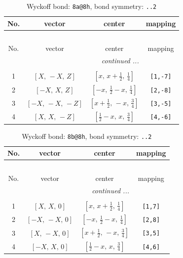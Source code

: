 \documentclass[fleqn,8pt]{jsarticle}
\begin{document}
\begin{longtable}{cccc}
\caption{Wyckoff bond: {\tt 8a@8h}, bond symmetry: {\tt ..2}}
 \\
 \hline \hline
No. & vector & center & mapping \\ \hline \endfirsthead

\multicolumn{3}{l}{\tablename\ \thetable{}} \\
 \hline \hline
No. & vector & center & mapping \\ \hline \endhead

 \hline \hline
\multicolumn{3}{r}{\footnotesize\it continued ...} \\ \endfoot

 \hline \hline
\multicolumn{3}{r}{} \\ \endlastfoot

1 & $\left[ X,\, - X,\, Z \right]$ & $\left[ x,\, x + \frac{1}{2},\, \frac{1}{4} \right]$ & {\tt [1,-7]} \\ \hline
2 & $\left[ - X,\, X,\, Z \right]$ & $\left[ - x,\, \frac{1}{2} - x,\, \frac{1}{4} \right]$ & {\tt [2,-8]} \\ \hline
3 & $\left[ - X,\, - X,\, - Z \right]$ & $\left[ x + \frac{1}{2},\, - x,\, \frac{3}{4} \right]$ & {\tt [3,-5]} \\ \hline
4 & $\left[ X,\, X,\, - Z \right]$ & $\left[ \frac{1}{2} - x,\, x,\, \frac{3}{4} \right]$ & {\tt [4,-6]} \\
\end{longtable}
\renewcommand{\arraystretch}{1.2}
\begin{longtable}{cccc}
\caption{Wyckoff bond: {\tt 8b@8h}, bond symmetry: {\tt ..2}}
 \\
 \hline \hline
No. & vector & center & mapping \\ \hline \endfirsthead

\multicolumn{3}{l}{\tablename\ \thetable{}} \\
 \hline \hline
No. & vector & center & mapping \\ \hline \endhead

 \hline \hline
\multicolumn{3}{r}{\footnotesize\it continued ...} \\ \endfoot

 \hline \hline
\multicolumn{3}{r}{} \\ \endlastfoot

1 & $\left[ X,\, X,\, 0 \right]$ & $\left[ x,\, x + \frac{1}{2},\, \frac{1}{4} \right]$ & {\tt [1,7]} \\ \hline
2 & $\left[ - X,\, - X,\, 0 \right]$ & $\left[ - x,\, \frac{1}{2} - x,\, \frac{1}{4} \right]$ & {\tt [2,8]} \\ \hline
3 & $\left[ X,\, - X,\, 0 \right]$ & $\left[ x + \frac{1}{2},\, - x,\, \frac{3}{4} \right]$ & {\tt [3,5]} \\ \hline
4 & $\left[ - X,\, X,\, 0 \right]$ & $\left[ \frac{1}{2} - x,\, x,\, \frac{3}{4} \right]$ & {\tt [4,6]} \\
\end{longtable}
\end{document}
